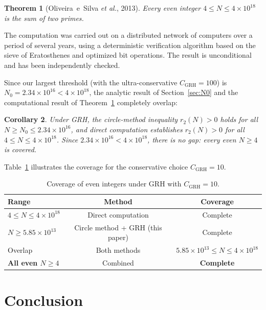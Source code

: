 \documentclass[11pt,a4paper]{article}
\theoremstyle{plain}
\newtheorem{theorem}{Theorem}[section]
\newtheorem{corollary}[theorem]{Corollary}
\theoremstyle{definition}
\theoremstyle{remark}
\numberwithin{equation}{section}
\numberwithin{table}{section}
\begin{document}
\begin{theorem}[Oliveira~e~Silva \emph{et al.}, 2013]
\label{thm:computation}
Every even integer $4\le N\le 4\times 10^{18}$ is the sum of two primes.
\end{theorem}

The computation was carried out on a distributed network of computers
over a period of several years, using a deterministic verification
algorithm based on the sieve of Eratosthenes and optimized bit
operations.  The result is unconditional and has been independently
checked.

Since our largest threshold (with the ultra-conservative
$C_{\mathrm{GRH}}=100$) is $N_0=2.34\times 10^{16} < 4\times 10^{18}$,
the analytic result of Section~\ref{sec:N0} and the computational
result of Theorem~\ref{thm:computation} completely overlap:

\begin{corollary}
\label{cor:overlap}
Under GRH, the circle-method inequality $r_2(N)>0$ holds for all
$N\ge N_0\le 2.34\times 10^{16}$, and direct computation establishes
$r_2(N)>0$ for all $4\le N\le 4\times 10^{18}$.  Since
$2.34\times 10^{16} < 4\times 10^{18}$, there is no gap: every even
$N\ge 4$ is covered.
\end{corollary}

Table~\ref{tab:coverage} illustrates the coverage for the conservative
choice $C_{\mathrm{GRH}}=10$.

\begin{table}[htbp]
\centering
\caption{Coverage of even integers under GRH with
$C_{\mathrm{GRH}}=10$.}
\label{tab:coverage}
\begin{tabular}{lcc}
\toprule
\textbf{Range} & \textbf{Method} & \textbf{Coverage} \\
\midrule
$4\le N\le 4\times 10^{18}$
  & Direct computation \cite{Oliveira2013}
  & Complete \\
$N\ge 5.85\times 10^{13}$
  & Circle method + GRH (this paper)
  & Complete \\
\midrule
Overlap
  & Both methods
  & $5.85\times 10^{13}\le N\le 4\times 10^{18}$ \\
\midrule
\textbf{All even $N\ge 4$}
  & Combined
  & \textbf{Complete} \\
\bottomrule
\end{tabular}
\end{table}

\section{Conclusion}
\label{sec:conclusion}
\end{document}
